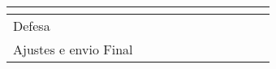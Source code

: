 {\begin{tabular}{|l|llllllllll|}
        \multicolumn{1}{l|}{} &
        \multicolumn{1}{l|}{} &
        \multicolumn{1}{l|}{} &
        \multicolumn{1}{l|}{\cellcolor[HTML]{C0C0C0}} &
        \multicolumn{1}{l|}{\cellcolor[HTML]{C0C0C0}} &
        \\ \hline
        Defesa &
        \multicolumn{1}{l|}{} &
        \multicolumn{1}{l|}{} &
        \multicolumn{1}{l|}{} &
        \multicolumn{1}{l|}{} &
        \multicolumn{1}{l|}{} &
        \multicolumn{1}{l|}{} &
        \multicolumn{1}{l|}{} &
        \multicolumn{1}{l|}{} &
        \multicolumn{1}{l|}{\cellcolor[HTML]{C0C0C0}} &
        \\ \hline
        Ajustes e envio Final &
        \multicolumn{1}{l|}{} &
        \multicolumn{1}{l|}{} &
        \multicolumn{1}{l|}{} &
        \multicolumn{1}{l|}{} &
        \multicolumn{1}{l|}{} &
        \multicolumn{1}{l|}{} &
        \multicolumn{1}{l|}{} &
        \multicolumn{1}{l|}{} &
        \multicolumn{1}{l|}{\cellcolor[HTML]{C0C0C0}} & \cellcolor[HTML]{C0C0C0}
        \\ \hline
    \end{tabular}%
    }